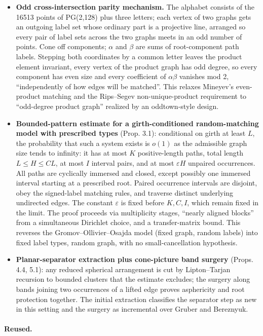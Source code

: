 \documentclass[11pt]{article}
\begin{document}
\begin{itemize}
\item \textbf{Odd cross-intersection parity mechanism.} The alphabet consists of the 16513 points of PG(2,128) plus three letters; each vertex of two graphs gets an outgoing label set whose ordinary part is a projective line, arranged so every pair of label sets across the two graphs meets in an odd number of points. Cone off components; $\alpha$ and $\beta$ are sums of root-component path labels. Stepping both coordinates by a common letter leaves the product element invariant, every vertex of the product graph has odd degree, so every component has even size and every coefficient of $\alpha\beta$ vanishes mod 2, ``independently of how edges will be matched''. This relaxes Mineyev's even-product matching and the Rips--Segev non-unique-product requirement to ``odd-degree product graph'' realized by an oddtown-style design.
\item \textbf{Bounded-pattern estimate for a girth-conditioned random-matching model with prescribed types} (Prop. 3.1): conditional on girth at least $L$, the probability that such a system exists is $o(1)$ as the admissible graph size tends to infinity: it has at most $K$ positive-length paths, total length $L\le H\le CL$, at most $I$ interval pairs, and at most $\varepsilon H$ unpaired occurrences. All paths are cyclically immersed and closed, except possibly one immersed interval starting at a prescribed root. Paired occurrence intervals are disjoint, obey the signed-label matching rules, and traverse distinct underlying undirected edges. The constant $\varepsilon$ is fixed before $K,C,I$, which remain fixed in the limit. The proof proceeds via multiplicity stages, ``nearly aligned blocks'' from a simultaneous Dirichlet choice, and a transfer-matrix bound. This reverses the Gromov--Ollivier--Osajda model (fixed graph, random labels) into fixed label types, random graph, with no small-cancellation hypothesis.
\item \textbf{Planar-separator extraction plus cone-picture band surgery} (Props. 4.4, 5.1): any reduced spherical arrangement is cut by Lipton--Tarjan recursion to bounded clusters that the estimate excludes; the surgery along bands joining two occurrences of a lifted edge proves asphericity and root protection together. The initial extraction classifies the separator step as new in this setting and the surgery as incremental over Gruber and Bereznyuk.
\end{itemize}

\paragraph{Reused.}
\end{document}

